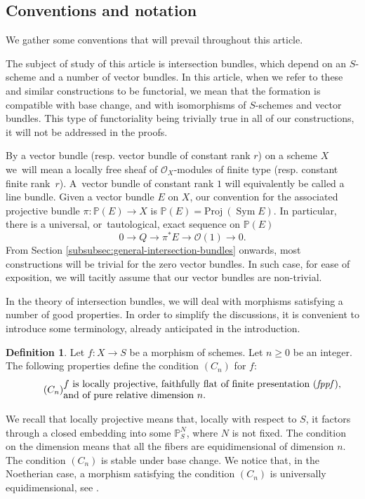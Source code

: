 \documentclass[11pt]{article}
\newcommand{\resp}{resp.\xspace}
\theoremstyle{plain}
\theoremstyle{definition}
\newtheorem{definition}[theorem]{Definition}
\newcommand{\PBbb}{\mathbb P}
\newcommand{\Ocal}{\mathcal O}
\newcommand{\fppf}{\emph{fppf}\xspace}
\DeclareMathOperator{\Sym}{Sym}
\begin{document}
\subsection{Conventions and notation}\label{subsec:conventions-notations}
We gather some conventions that will prevail throughout this article.

The subject of study of this article is intersection bundles, which depend on an $S$-scheme and a number of vector bundles. In this article, when we refer to these and similar constructions to be functorial, we mean that the formation is compatible with base change, and with isomorphisms of $S$-schemes and vector bundles. This type of functoriality being trivially true in all of our constructions, it will not be addressed in the proofs.

By a vector bundle (\resp vector bundle of constant rank $r$) on a scheme $X$ we~will mean a locally free sheaf of $\Ocal_{X}$-modules of finite type (\resp constant finite rank~$r$). A~vector bundle of constant rank $1$ will equivalently be called a line bundle. Given a vector bundle $E$ on $X$, our convention for the associated projective bundle \hbox{$\pi\colon\PBbb(E)\to X$} is $\PBbb(E)=\mathrm{Proj}\ (\Sym E)$. In particular, there is a universal, or~tautological, exact sequence on $\PBbb(E)$\vspace*{-3pt}\enlargethispage{\baselineskip}
\begin{equation}\label{eq:tautological-exact-sequence}
0 \to Q \to \pi^\ast E \to \Ocal(1) \to 0.
\end{equation}
From Section \ref{subsubsec:general-intersection-bundles} onwards, most constructions will be trivial for the zero vector bundles. In such case, for ease of exposition, we will tacitly assume that our vector bundles are non-trivial.

In the theory of intersection bundles, we will deal with morphisms satisfying a number of good properties. In order to simplify the discussions, it is convenient to introduce some terminology, already anticipated in the introduction.

\begin{definition}
Let $f \colon X \to S$ be a morphism of schemes. Let $n\geq 0 $ be an integer. The following properties define the condition $(C_n)$ for $f$:
\begin{equation}\tag{$C_n$}\label{condition-Cn}
\begin{split}
&f \text{ is locally projective, faithfully flat of finite presentation (\fppf),}
\\[-3.5pt]
& \text{and of pure relative dimension }n.
\end{split}
\end{equation}
\end{definition}
We recall that locally projective means that, locally with respect to $S$, it factors through a closed embedding into some $\PBbb^N_S$, where $N$ is not fixed. The condition on the dimension means that all the fibers are equidimensional of dimension $n$. The condition $(C_{n})$ is stable under base change. We notice that, in the Noetherian case, a morphism satisfying the condition $(C_{n})$ is universally equidimensional, see \cite[Def.\,2.1.2 \& Prop.\,2.1.7 (2)]{Suslin-Voevodsky}.
\end{document}
